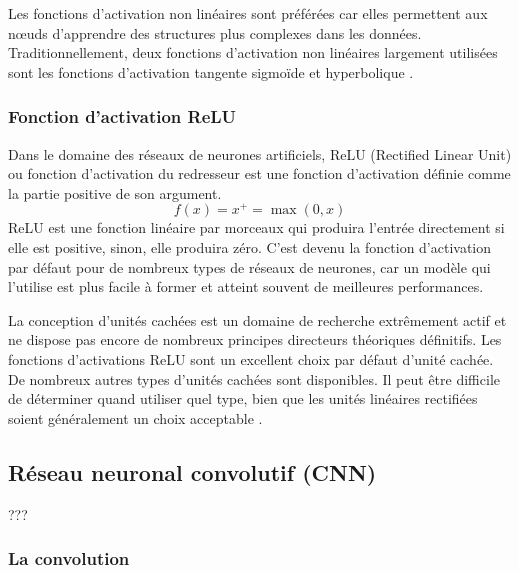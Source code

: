 	Les fonctions d'activation non linéaires sont préférées car elles permettent aux nœuds d'apprendre des structures plus complexes dans les données. Traditionnellement, deux fonctions d'activation non linéaires largement utilisées sont les fonctions d'activation tangente sigmoïde et hyperbolique .
	\subsubsection{Fonction d'activation ReLU}
	
	Dans le domaine des réseaux de neurones artificiels, ReLU (Rectified Linear Unit) ou fonction d'activation du redresseur est une fonction d'activation définie comme la partie positive de son argument.
	$${\displaystyle f(x)=x^{+}=\max(0,x)}$$
	ReLU est une fonction linéaire par morceaux qui produira l'entrée directement si elle est positive, sinon, elle produira zéro. C'est devenu la fonction d'activation par défaut pour de nombreux types de réseaux de neurones, car un modèle qui l'utilise est plus facile à former et atteint souvent de meilleures performances.
	
	
	La conception d'unités cachées est un domaine de recherche extrêmement actif et ne dispose pas encore de nombreux principes directeurs théoriques définitifs.
	Les fonctions d'activations ReLU sont un excellent choix par défaut d'unité cachée. De nombreux autres types d'unités cachées sont disponibles. Il peut être diﬃcile de déterminer quand utiliser quel type, bien que les unités linéaires rectiﬁées soient généralement un choix acceptable \cite{goodfellow2016deep}.


	
	
	\subsection{Réseau neuronal convolutif (CNN)}
	???
	\cite{shin2016deep} 
	
	\subsubsection{La convolution}
	

